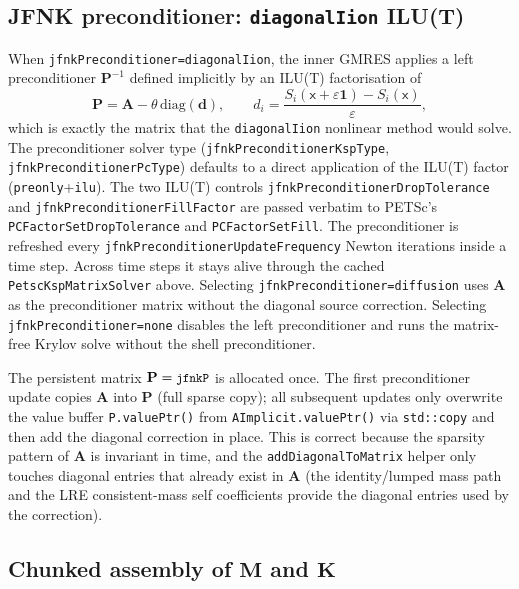 \documentclass[11pt,a4paper]{article}
\newcommand{\code}[1]{\texttt{\small #1}}
\newcommand{\Mmass}{\mathbf{M}}
\newcommand{\Kstif}{\mathbf{K}}
\newcommand{\Aimp}{\mathbf{A}}
\begin{document}
\subsection{JFNK preconditioner: \texorpdfstring{\code{diagonalIion}}{diagonalIion} ILU(T)}

When \code{jfnkPreconditioner=diagonalIion}, the inner GMRES applies a
left preconditioner $\mathbf{P}^{-1}$ defined implicitly by an ILU(T)
factorisation of
\begin{equation}
  \mathbf{P}
  =
  \Aimp - \theta\,\mathrm{diag}(\mathbf{d}),
  \qquad
  d_i =
  \frac{S_i(\mathsf{x}+\varepsilon\mathbf{1})-S_i(\mathsf{x})}{\varepsilon},
  \label{eq:jfnk-pc-matrix}
\end{equation}
which is exactly the matrix that the \code{diagonalIion} nonlinear method
would solve. The preconditioner solver type (\code{jfnkPreconditionerKspType},
\code{jfnkPreconditionerPcType}) defaults to a direct application of the
ILU(T) factor (\code{preonly}+\code{ilu}). The two ILU(T) controls
\code{jfnkPreconditionerDropTolerance} and
\code{jfnkPreconditionerFillFactor} are passed verbatim to PETSc's
\code{PCFactorSetDropTolerance} and \code{PCFactorSetFill}. The preconditioner
is refreshed every \code{jfnkPreconditionerUpdateFrequency} Newton iterations
inside a time step. Across time steps it stays alive through the cached
\code{PetscKspMatrixSolver} above. Selecting
\code{jfnkPreconditioner=diffusion} uses $\Aimp$ as the preconditioner matrix
without the diagonal source correction. Selecting
\code{jfnkPreconditioner=none} disables the left preconditioner and runs the
matrix-free Krylov solve without the shell preconditioner.

The persistent matrix $\mathbf{P}=\code{jfnkP}$ is allocated once. The first
preconditioner update copies $\Aimp$ into $\mathbf{P}$ (full sparse copy); all
subsequent updates only overwrite the value buffer
\code{P.valuePtr()} from \code{AImplicit.valuePtr()} via \code{std::copy} and
then add the diagonal correction in place. This is correct because the
sparsity pattern of $\Aimp$ is invariant in time, and the
\code{addDiagonalToMatrix} helper only touches diagonal entries that already
exist in $\Aimp$ (the identity/lumped mass path and the LRE consistent-mass
self coefficients provide the diagonal entries used by the correction).

\subsection{Chunked assembly of \texorpdfstring{$\Mmass$}{M} and
\texorpdfstring{$\Kstif$}{K}}
\label{sec:chunked-assembly}
\end{document}
